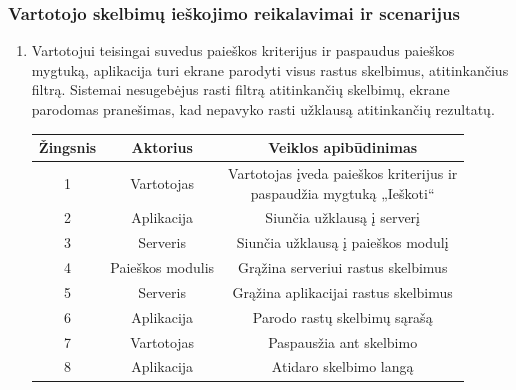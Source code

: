 \documentclass[12pt]{article}
\begin{document}
	\subsubsection{Vartotojo skelbimų ieškojimo reikalavimai ir scenarijus}
	\begin{enumerate}
		\item Vartotojui teisingai suvedus paieškos kriterijus ir paspaudus paieškos mygtuką, aplikacija turi ekrane parodyti visus rastus skelbimus, atitinkančius filtrą. Sistemai nesugebėjus rasti filtrą atitinkančių skelbimų, ekrane parodomas pranešimas, kad nepavyko rasti užklausą atitinkančių rezultatų.
		
		\begin{center}
		\begin{tabular}{ | c | c | c | }
			\hline
			Žingsnis & Aktorius     & Veiklos apibūdinimas \\ \hline
			1        & Vartotojas   & \makecell{Vartotojas įveda paieškos kriterijus ir \\ paspaudžia mygtuką „Ieškoti“} \\ \hline
			2        & Aplikacija   & Siunčia užklausą į serverį \\ \hline
			3        & Serveris     & Siunčia užklausą į paieškos modulį \\ \hline
			4        & Paieškos modulis & Grąžina serveriui rastus skelbimus \\ \hline
			5        & Serveris     & Grąžina aplikacijai rastus skelbimus  \\ \hline
			6        & Aplikacija   & Parodo rastų skelbimų sąrašą \\ \hline
			7        & Vartotojas   & Paspausžia ant skelbimo \\ \hline
			8        & Aplikacija   & Atidaro skelbimo langą \\ \hline
		\end{tabular}
		\end{center}		
		

\end{enumerate}
\end{document}
